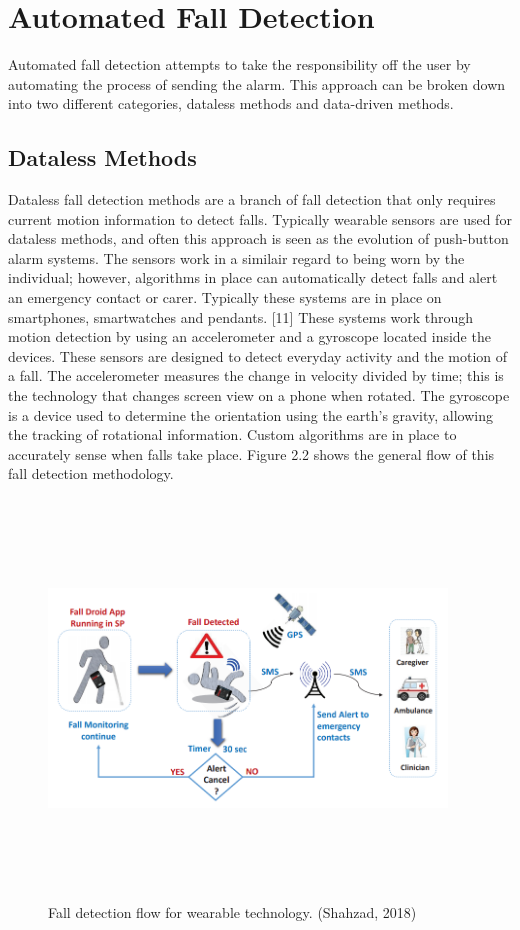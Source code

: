 \section{Automated Fall Detection}
Automated fall detection attempts to take the responsibility off the user by automating the process of sending the alarm. This approach can be broken down into two different categories, dataless methods and data-driven methods.
\subsection{Dataless Methods}
Dataless fall detection methods are a branch of fall detection that only requires current motion information to detect falls. Typically wearable sensors are used for dataless methods, and often this approach is seen as the evolution of push-button alarm systems. The sensors work in a similair regard to being worn by the individual; however, algorithms in place can automatically detect falls and alert an emergency contact or carer. Typically these systems are in place on smartphones, smartwatches and pendants. [11] These systems work through motion detection by using an accelerometer and a gyroscope located inside the devices. These sensors are designed to detect everyday activity and the motion of a fall. The accelerometer measures the change in velocity divided by time; this is the technology that changes screen view on a phone when rotated. The gyroscope is a device used to determine the orientation using the earth's gravity, allowing the tracking of rotational information. Custom algorithms are in place to accurately sense when falls take place. Figure 2.2 shows the general flow of this fall detection methodology. 

\begin{figure}[H]
    \centering
    \includegraphics[width=400px,height=400px,keepaspectratio]{fall detection flow.png}
    \vspace{-2ex}%
    \caption{Fall detection flow for wearable technology. (Shahzad, 2018)}
    \label{fig:my_label}
\end{figure}

